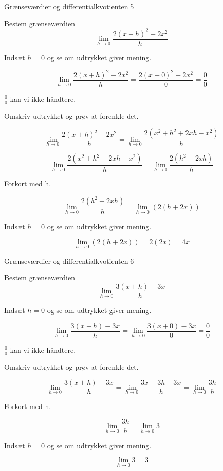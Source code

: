 \documentclass{article}
\begin{document}
\newpage
\begin{exercise}{Grænseværdier og differentialkvotienten 5}
	
	Bestem grænseværdien 
	\[
	\lim_{h \to 0} \frac{2(x+h)^2-2x^2}{h}
	\]
	
	
	\hint
	Indsæt $h=0$ og se om udtrykket giver mening.
	
	\hint
	\[
	\lim_{h \to 0} \frac{2(x+h)^2-2x^2}{h} = \frac{2(x+0)^2-2x^2}{0} = \frac{0}{0}
	\]
	
	\hint
	$\frac{0}{0}$ kan vi ikke håndtere.
	
	\hint
	Omskriv udtrykket og prøv at forenkle det.
	
	\hint
	\[
	\lim_{h \to 0} \frac{2(x+h)^2-2x^2}{h} = \lim_{h \to 0} \frac{2\left(x^2+h^2+2xh-x^2\right)}{h}
	\]
	
	\hint
	\[
	\lim_{h \to 0} \frac{2\left(x^2+h^2+2xh-x^2\right)}{h} = \lim_{h \to 0} \frac{2\left(h^2+2xh\right)}{h}
	\]
	
	\hint
	Forkort med h.
	
	\hint
	\[
	\lim_{h \to 0} \frac{2\left(h^2+2xh\right)}{h} = \lim_{h \to 0} \left(2(h + 2x)\right)
	\]
	
	\hint
	Indsæt $h=0$ og se om udtrykket giver mening.
	
	\hint
	\[
	\lim_{h \to 0} \left(2(h + 2x)\right) = 2(2x) = 4x
	\]
	
\end{exercise}

\newpage
\begin{exercise}{Grænseværdier og differentialkvotienten 6}
	
	Bestem grænseværdien 
	\[
	\lim_{h \to 0} \frac{3(x+h)-3x}{h}
	\]
	
	
	\hint
	Indsæt $h=0$ og se om udtrykket giver mening.
	
	\hint
	\[
	\lim_{h \to 0} \frac{3(x+h)-3x}{h}  =	\lim_{h \to 0} \frac{3(x+0)-3x}{0} = \frac{0}{0}
	\]
	
	\hint
	$\frac{0}{0}$ kan vi ikke håndtere.
	
	\hint
	Omskriv udtrykket og prøv at forenkle det.
	
	\hint
	\[
	\lim_{h \to 0} \frac{3(x+h)-3x}{h} =  \lim_{h \to 0} \frac{3x+3h-3x}{h} = \lim_{h \to 0} \frac{3h}{h}
	\]
	
	\hint
	Forkort med h.
	
	\hint
	\[
	\lim_{h \to 0} \frac{3h}{h} = \lim_{h \to 0} 3 
	\]
	
	\hint
	Indsæt $h=0$ og se om udtrykket giver mening.
	
	\hint
	\[
	\lim_{h \to 0} 3  = 3
	\]
	
\end{exercise}
\end{document}

